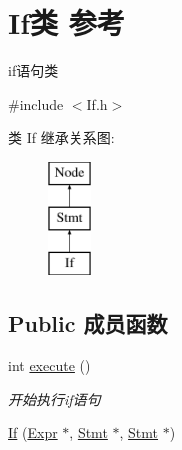 \hypertarget{class_if}{}\section{If类 参考}
\label{class_if}


if语句类  




{\ttfamily \#include $<$If.\+h$>$}

类 If 继承关系图\+:\begin{figure}[H]
\begin{center}
\leavevmode
\includegraphics[height=3.000000cm]{class_if}
\end{center}
\end{figure}
\subsection*{Public 成员函数}
\begin{DoxyCompactItemize}
\item 
int \hyperlink{class_if_aeadf929258ccd07a239879c118fb152f}{execute} ()\hypertarget{class_if_aeadf929258ccd07a239879c118fb152f}{}\label{class_if_aeadf929258ccd07a239879c118fb152f}

\begin{DoxyCompactList}\small\item\em 开始执行if语句 \end{DoxyCompactList}\item 
\hyperlink{class_if_a398387169436db838e9935b985a8f4a9}{If} (\hyperlink{class_expr}{Expr} $\ast$, \hyperlink{class_stmt}{Stmt} $\ast$, \hyperlink{class_stmt}{Stmt} $\ast$)
\end{DoxyCompactItemize}
